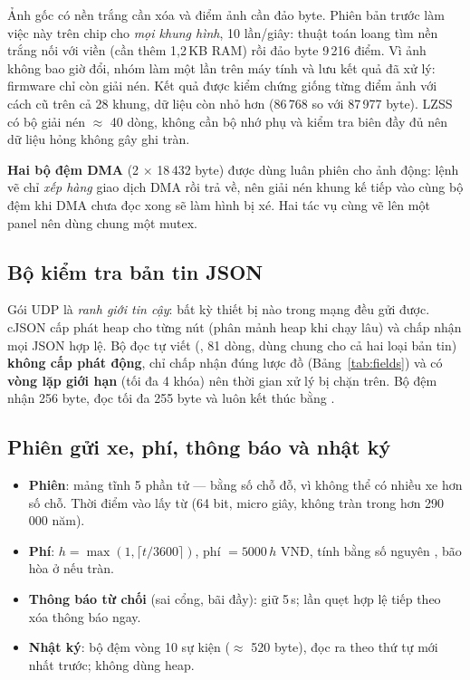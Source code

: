 \begin{lydo}
Ảnh gốc có nền trắng cần xóa và điểm ảnh cần đảo byte. Phiên bản trước làm việc
này trên chip cho \emph{mọi khung hình}, 10 lần/giây: thuật toán loang tìm nền trắng
nối với viền (cần thêm 1,2\,KB RAM) rồi đảo byte 9\,216 điểm. Vì ảnh không bao giờ
đổi, nhóm làm một lần trên máy tính và lưu kết quả đã xử lý: firmware chỉ còn giải
nén. Kết quả được kiểm chứng giống từng điểm ảnh với cách cũ trên cả 28 khung, dữ
liệu còn nhỏ hơn (86\,768 so với 87\,977 byte). LZSS có bộ giải nén $\approx$ 40 dòng,
không cần bộ nhớ phụ và kiểm tra biên đầy đủ nên dữ liệu hỏng không gây ghi tràn.
\end{lydo}

\textbf{Hai bộ đệm DMA} (2 $\times$ 18\,432 byte) được dùng luân phiên cho ảnh động:
lệnh vẽ chỉ \emph{xếp hàng} giao dịch DMA rồi trả về, nên giải nén khung kế tiếp vào
cùng bộ đệm khi DMA chưa đọc xong sẽ làm hình bị xé. Hai tác vụ cùng vẽ lên một
panel nên dùng chung một mutex.

\subsection{Bộ kiểm tra bản tin JSON}
\begin{lydo}
Gói UDP là \emph{ranh giới tin cậy}: bất kỳ thiết bị nào trong mạng đều gửi được.
cJSON cấp phát heap cho từng nút (phân mảnh heap khi chạy lâu) và chấp nhận mọi JSON
hợp lệ. Bộ đọc tự viết (, 81 dòng, dùng chung cho cả hai loại bản
tin) \textbf{không cấp phát động}, chỉ chấp nhận đúng lược đồ (Bảng~\ref{tab:fields})
và có \textbf{vòng lặp giới hạn} (tối đa 4 khóa) nên thời gian xử lý bị chặn trên.
Bộ đệm nhận 256 byte, đọc tối đa 255 byte và luôn kết thúc bằng .
\end{lydo}

\subsection{Phiên gửi xe, phí, thông báo và nhật ký}
\begin{itemize}
\item \textbf{Phiên}: mảng tĩnh 5 phần tử — bằng số chỗ đỗ, vì không thể có nhiều xe hơn số chỗ.
  Thời điểm vào lấy từ  (64 bit, micro giây, không tràn trong
  hơn 290\,000 năm).
\item \textbf{Phí}: $h=\max(1,\lceil t/3600\rceil)$, phí $=5000\,h$ VNĐ, tính bằng số
  nguyên , bão hòa ở  nếu tràn.
\item \textbf{Thông báo từ chối} (sai cổng, bãi đầy): giữ 5\,s; lần quẹt hợp lệ tiếp
  theo xóa thông báo ngay.
\item \textbf{Nhật ký}: bộ đệm vòng 10 sự kiện ($\approx$ 520 byte), đọc ra theo thứ tự mới
  nhất trước; không dùng heap.
\end{itemize}

